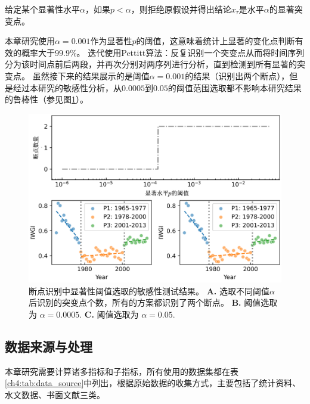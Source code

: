 给定某个显著性水平$\alpha$，如果$p < \alpha$，则拒绝原假设并得出结论$x_{\tau}$是水平$\alpha$的显著突变点。

本章研究使用$\alpha = 0.001$作为显著性$p$的阈值，这意味着统计上显著的变化点判断有效的概率大于$99.9\%$。
迭代使用Pettitt算法：反复识别一个突变点从而将时间序列分为该时间点前后两段，并再次分别对两序列进行分析，直到检测到所有显著的突变点。
虽然接下来的结果展示的是阈值$\alpha = 0.001$的结果（识别出两个断点），但是经过本研究的敏感性分析，从$0.0005$到$0.05$的阈值范围选取都不影响本研究结果的鲁棒性（参见图\ref{ch4:fig:sensitivity}）。

\begin{figure}[htb] %
    \includegraphics[width=\textwidth]{img/ch4/ch4_sensitivity.png}
    \caption[断点识别中显著性阈值选取的敏感性测试]{断点识别中显著性阈值选取的敏感性测试结果。
    \textbf{A.} 选取不同阈值$\alpha$后识别的突变点个数，所有的方案都识别了两个断点。
    \textbf{B.} 阈值选取为 $\alpha=0.0005$.
    \textbf{C.} 阈值选取为 $\alpha=0.05$.}\label{ch4:fig:sensitivity}
\end{figure}

\subsection{数据来源与处理}
本章研究需要计算诸多指标和子指标，所有使用的数据集都在表\ref{ch4:tab:data_source}中列出，根据原始数据的收集方式，主要包括了统计资料、水文数据、书面文献三类。



